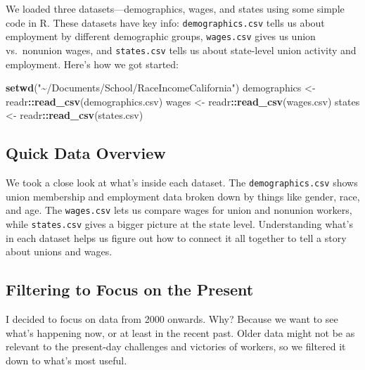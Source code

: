 \documentclass[
]{book}
\newenvironment{Shaded}{\begin{snugshade}}{\end{snugshade}}
\newcommand{\FunctionTok}[1]{\textcolor[rgb]{0.13,0.29,0.53}{\textbf{#1}}}
\newcommand{\NormalTok}[1]{#1}
\newcommand{\OtherTok}[1]{\textcolor[rgb]{0.56,0.35,0.01}{#1}}
\newcommand{\SpecialCharTok}[1]{\textcolor[rgb]{0.81,0.36,0.00}{\textbf{#1}}}
\newcommand{\StringTok}[1]{\textcolor[rgb]{0.31,0.60,0.02}{#1}}
\theoremstyle{definition}
\theoremstyle{definition}
\theoremstyle{definition}
\theoremstyle{definition}
\theoremstyle{remark}
\begin{document}
We loaded three datasets---demographics, wages, and states using some simple code in R. These datasets have key info: \texttt{demographics.csv} tells us about employment by different demographic groups, \texttt{wages.csv} gives us union vs.~nonunion wages, and \texttt{states.csv} tells us about state-level union activity and employment. Here's how we got started:

\begin{Shaded}
\begin{Highlighting}[]
\FunctionTok{setwd}\NormalTok{(}\StringTok{"\textasciitilde{}/Documents/School/RaceIncomeCalifornia"}\NormalTok{)}
\NormalTok{demographics }\OtherTok{\textless{}{-}}\NormalTok{ readr}\SpecialCharTok{::}\FunctionTok{read\_csv}\NormalTok{(}\StringTok{\textquotesingle{}demographics.csv\textquotesingle{}}\NormalTok{)}
\NormalTok{wages }\OtherTok{\textless{}{-}}\NormalTok{ readr}\SpecialCharTok{::}\FunctionTok{read\_csv}\NormalTok{(}\StringTok{\textquotesingle{}wages.csv\textquotesingle{}}\NormalTok{)}
\NormalTok{states }\OtherTok{\textless{}{-}}\NormalTok{ readr}\SpecialCharTok{::}\FunctionTok{read\_csv}\NormalTok{(}\StringTok{\textquotesingle{}states.csv\textquotesingle{}}\NormalTok{)}
\end{Highlighting}
\end{Shaded}

\subsection{Quick Data Overview}\label{quick-data-overview}

We took a close look at what's inside each dataset. The \texttt{demographics.csv} shows union membership and employment data broken down by things like gender, race, and age. The \texttt{wages.csv} lets us compare wages for union and nonunion workers, while \texttt{states.csv} gives a bigger picture at the state level. Understanding what's in each dataset helps us figure out how to connect it all together to tell a story about unions and wages.

\subsection{Filtering to Focus on the Present}\label{filtering-to-focus-on-the-present}

I decided to focus on data from 2000 onwards. Why? Because we want to see what's happening now, or at least in the recent past. Older data might not be as relevant to the present-day challenges and victories of workers, so we filtered it down to what's most useful.
\end{document}
